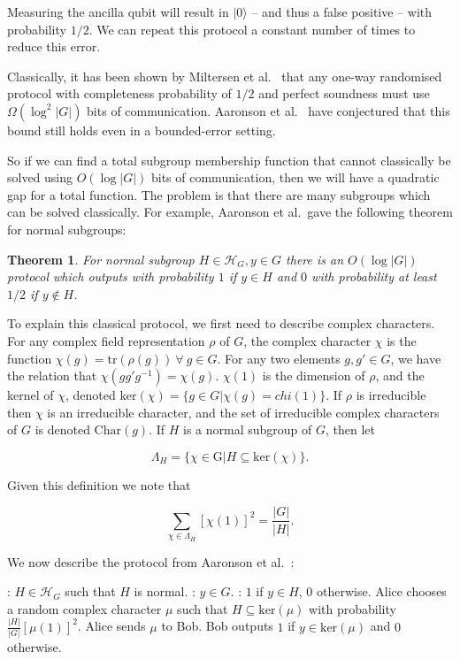 \documentclass[a4paper]{article}
\newtheorem{theorem}{Theorem}[section]
\begin{document}
        Measuring the ancilla qubit will result in $|0\rangle$ -- and thus a false positive -- with probability $1/2$. We can repeat this protocol a constant number of times to reduce this error.

        Classically, it has been shown by Miltersen et al.~\cite{Miltersen199837} that any one-way randomised protocol with completeness probability of $1/2$ and perfect soundness must use $\Omega(\log^2|G|)$ bits of communication. Aaronson et al.~ have conjectured that this bound still holds even in a bounded-error setting.

        So if we can find a total subgroup membership function that cannot classically be solved using $O(\log |G|)$ bits of communication, then we will have a quadratic gap for a total function. The problem is that there are many subgroups which can be solved classically. For example, Aaronson et al.~gave the following theorem for normal subgroups:

        \begin{theorem}
            \label{thm:norm-sg-membership}
            For normal subgroup $H \in \mathscr{H}_G, y \in G$ there is an $O(\log|G|)$ protocol which outputs with probability $1$ if $y \in H$ and $0$ with probability at least $1/2$ if $y \notin H$.
        \end{theorem}

        To explain this classical protocol, we first need to describe complex characters. For any complex field representation $\rho$ of $G$, the complex character $\chi$ is the function $\chi(g) = \textrm{tr}(\rho(g))~\forall~g\in G$. For any two elements $g, g' \in G$, we have the relation that $\chi(gg'g^{-1}) = \chi(g)$. $\chi(1)$ is the dimension of $\rho$, and the kernel of $\chi$, denoted $\textrm{ker}(\chi) = \{g \in G|\chi(g) = chi(1)\}$. If $\rho$ is irreducible then $\chi$ is an irreducible character, and the set of irreducible complex characters of $G$ is denoted $\textrm{Char}(g)$. If $H$ is a normal subgroup of $G$, then let

        $$\Lambda_H = \{\chi \in \textrm{G}|H\subseteq \textrm{ker}(\chi)\}.$$

        Given this definition we note that

        $$\sum_{\chi \in \Lambda_H}[\chi(1)]^2 = \frac{|G|}{|H|}.$$

        We now describe the protocol from Aaronson et al.~\cite{0902.3175}:

        \begin{codebox}
            \zi {}: $H \in \mathscr{H}_G$ such that $H$ is normal.
            \zi {}: $y \in G$.
            \zi {}: $1$ if $y \in H$, $0$ otherwise.
            \li Alice chooses a random complex character $\mu$ such that $H \subseteq \textrm{ker}(\mu)$ with probability $\frac{|H|}{|G|}[\mu(1)]^2$.
            \li Alice sends $\mu$ to Bob.
            \li Bob outputs $1$ if $y \in \textrm{ker}(\mu)$ and $0$ otherwise.
        \end{codebox}
\end{document}
